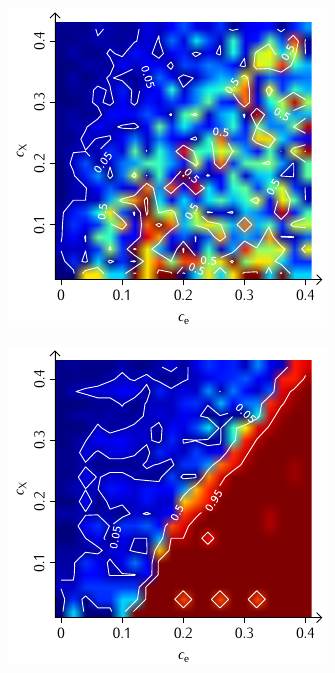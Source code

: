 \documentclass[a4paper, 10pt, twoside, openany]{book} %
\begin{document}
\begin{figure}
\begin{minipage}[t]{0.48\textwidth}
        \label{H_random_P}
    \end{minipage}
    \hfill
    \begin{minipage}[t]{0.48\textwidth}
        \includegraphics[width=\textwidth]{Abbildungen/Phasendiagramme/Konturen/H_penalty_random_P.pdf}
        \label{H_penalty_random_P}
    \end{minipage}
    \begin{minipage}[t]{0.48\textwidth}
        \includegraphics[width=\textwidth]{Abbildungen/Phasendiagramme/Konturen/H_individual_P.pdf}

\end{minipage}
\end{figure}
\end{document}
